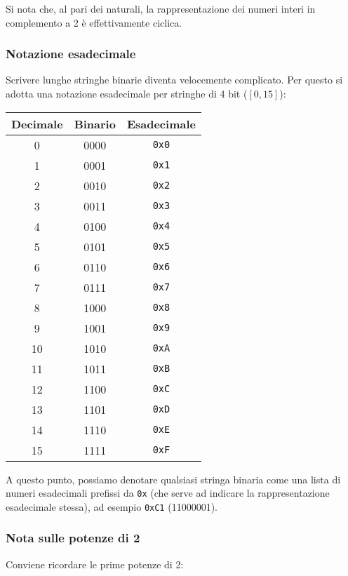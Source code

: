 \documentclass[a4paper,11pt]{article}
\begin{document}
Si nota che, al pari dei naturali, la rappresentazione dei numeri interi in complemento a 2 è effettivamente ciclica.

\subsubsection{Notazione esadecimale}
Scrivere lunghe stringhe binarie diventa velocemente complicato. 
Per questo si adotta una notazione esadecimale per stringhe di 4 bit ($[0, 15]$):

\begin{table}[h!]
    \centering
    \begin{tabular}{ c | c | c }
        \bfseries Decimale & \bfseries Binario & \bfseries Esadecimale \\
        \hline
        0  & 0000 & \texttt{0x0} \\
        1  & 0001 & \texttt{0x1} \\
        2  & 0010 & \texttt{0x2} \\
        3  & 0011 & \texttt{0x3} \\
        4  & 0100 & \texttt{0x4} \\
        5  & 0101 & \texttt{0x5} \\
        6  & 0110 & \texttt{0x6} \\
        7  & 0111 & \texttt{0x7} \\
        8  & 1000 & \texttt{0x8} \\
        9  & 1001 & \texttt{0x9} \\
        10 & 1010 & \texttt{0xA} \\
        11 & 1011 & \texttt{0xB} \\
        12 & 1100 & \texttt{0xC} \\
        13 & 1101 & \texttt{0xD} \\
        14 & 1110 & \texttt{0xE} \\
        15 & 1111 & \texttt{0xF} \\
    \end{tabular}
\end{table}

A questo punto, possiamo denotare qualsiasi stringa binaria come una lista di numeri esadecimali prefissi da \texttt{0x} (che serve ad indicare la rappresentazione esadecimale stessa), ad esempio \texttt{0xC1} (11000001).

\subsubsection{Nota sulle potenze di 2}
Conviene ricordare le prime potenze di 2:
\end{document}
